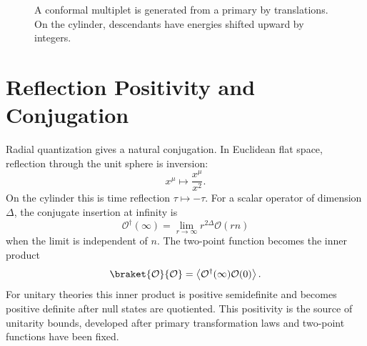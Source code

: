 \begin{figure}[H]
  \centering
  \caption{A conformal multiplet is generated from a primary by translations.
  On the cylinder, descendants have energies shifted upward by integers.}
  \label{fig:primary-descendant-multiplet}
\end{figure}

\section{Reflection Positivity and Conjugation}

Radial quantization gives a natural conjugation.  In Euclidean flat space,
reflection through the unit sphere is inversion:
\[
  x^\mu\mapsto \frac{x^\mu}{x^2}.
\]
On the cylinder this is time reflection \(\tau\mapsto-\tau\).  For a scalar
operator of dimension \(\Delta\), the conjugate insertion at infinity is
\[
  \mathcal O^\dagger(\infty)
  =
  \lim_{r\to\infty}r^{2\Delta}\mathcal O(r n)
\]
when the limit is independent of \(n\).  The two-point function becomes the
inner product
\[
  \braket{\mathcal O}{\mathcal O}
  =
  \left\langle
  \mathcal O^\dagger(\infty)\mathcal O(0)
  \right\rangle .
\]
For unitary theories this inner product is positive semidefinite and becomes
positive definite after null states are quotiented.  This positivity is the
source of unitarity bounds, developed after primary transformation laws and
two-point functions have been fixed.

